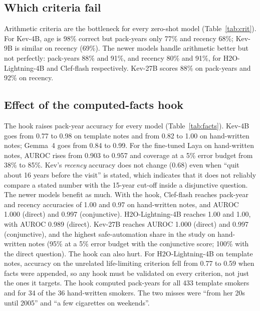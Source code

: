 \documentclass[11pt]{article}
\begin{document}
\subsection{Which criteria fail}
\label{sec:res-criteria}
Arithmetic criteria are the bottleneck for every zero-shot model (Table~\ref{tab:crit}).
For Kev-4B, age is 98\% correct but pack-years only 77\% and recency 68\%; Kev-9B is similar on recency (69\%).
The newer models handle arithmetic better but not perfectly: pack-years 88\% and 91\%, and recency 80\% and 91\%, for H2O-Lightning-4B and Clef-flash respectively.
Kev-27B scores 88\% on pack-years and 92\% on recency.


\subsection{Effect of the computed-facts hook}
\label{sec:res-facts}
The hook raises pack-year accuracy for every model (Table~\ref{tab:facts}). Kev-4B goes from 0.77 to 0.98 on template notes and from 0.82 to 1.00 on hand-written notes; Gemma~4 goes from 0.84 to 0.99.
For the fine-tuned Laya on hand-written notes, AUROC rises from 0.903 to 0.957 and coverage at a 5\% error budget from 38\% to 85\%.
Kev's \emph{recency} accuracy does not change (0.68) even when ``quit about 16 years before the visit'' is stated, which indicates that it does not reliably compare a stated number with the 15-year cut-off inside a disjunctive question.
The newer models benefit as much. With the hook, Clef-flash reaches pack-year and recency accuracies of 1.00 and 0.97 on hand-written notes, and AUROC 1.000 (direct) and 0.997 (conjunctive). H2O-Lightning-4B reaches 1.00 and 1.00, with AUROC 0.989 (direct). Kev-27B reaches AUROC 1.000 (direct) and 0.997 (conjunctive), and the highest safe-automation share in the study on hand-written notes (95\% at a 5\% error budget with the conjunctive score; 100\% with the direct question).
The hook can also hurt. For H2O-Lightning-4B on template notes, accuracy on the unrelated life-limiting criterion fell from 0.77 to 0.59 when facts were appended, so any hook must be validated on every criterion, not just the ones it targets.
The hook computed pack-years for all 433 template smokers and for 34 of the 36 hand-written smokers. The two misses were ``from her 20s until 2005'' and ``a few cigarettes on weekends''.

\end{document}
